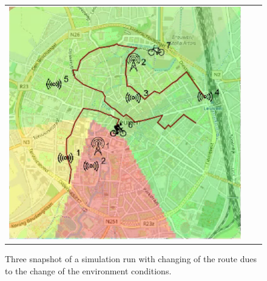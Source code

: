 \begin{figure}[h]
\begin{tabular}{lll}
         \includegraphics[scale=0.42]{figures/sim1snap3.png} 
    \end{tabular}
    \caption[Three snapshot of a simulation run with changing of the route]{Three snapshot of a simulation run with changing of the route dues to the change of the environment conditions.}
    \label{fig:sim1}
\end{figure}
% 

